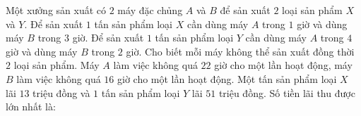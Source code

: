 \begin{ex}
  Một xưởng sản xuất có ${2}$ máy đặc chủng ${A}$ và ${B}$ để sản xuất ${2}$ loại sản phẩm ${X}$ và ${Y}$. Để sản xuất $ {1} $ tấn sản phẩm loại ${X}$ cần dùng máy ${A} $ trong $ {1} $ giờ và dùng máy $ {B}$ trong $ {3} $ giờ. Để sản xuất $ {1} $ tấn sản phẩm loại ${Y}  $ cần dùng máy $ {A} $ trong ${4} $ giờ và dùng máy $B$ trong ${2}$ giờ. Cho biết mỗi máy không thể sản xuất đồng thời ${2}$ loại sản phẩm. Máy ${A}$ làm việc không quá ${22}$ giờ cho một lần hoạt động, máy ${B}$ làm việc không quá ${16} $ giờ cho một lần hoạt động. Một tấn sản phẩm loại ${X}$ lãi ${13} $ triệu đồng và $ {1} $ tấn sản phẩm loại ${Y}$ lãi ${51}$ triệu đồng. Số tiền lãi thu được lớn nhất là:

\end{ex}

